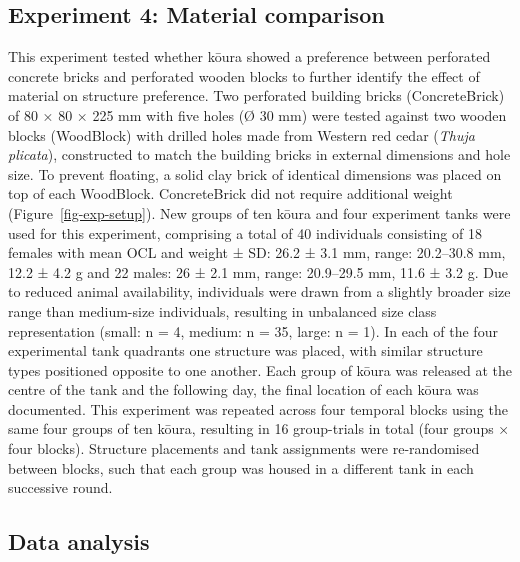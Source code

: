 \documentclass[
  12pt,
  a4paper,
  oneside]{scrbook}
\begin{document}
\subsection{Experiment 4: Material
comparison}\label{experiment-4-material-comparison}

This experiment tested whether kōura showed a preference between
perforated concrete bricks and perforated wooden blocks to further
identify the effect of material on structure preference. Two perforated
building bricks (ConcreteBrick) of 80 × 80 × 225 mm with five holes (Ø
30 mm) were tested against two wooden blocks (WoodBlock) with drilled
holes made from Western red cedar (\emph{Thuja plicata}), constructed to
match the building bricks in external dimensions and hole size. To
prevent floating, a solid clay brick of identical dimensions was placed
on top of each WoodBlock. ConcreteBrick did not require additional
weight (Figure~\ref{fig-exp-setup}). New groups of ten kōura and four
experiment tanks were used for this experiment, comprising a total of 40
individuals consisting of 18 females with mean OCL and weight ± SD: 26.2
± 3.1 mm, range: 20.2--30.8 mm, 12.2 ± 4.2 g and 22 males: 26 ± 2.1 mm,
range: 20.9--29.5 mm, 11.6 ± 3.2 g. Due to reduced animal availability,
individuals were drawn from a slightly broader size range than
medium-size individuals, resulting in unbalanced size class
representation (small: n = 4, medium: n = 35, large: n = 1). In each of
the four experimental tank quadrants one structure was placed, with
similar structure types positioned opposite to one another. Each group
of kōura was released at the centre of the tank and the following day,
the final location of each kōura was documented. This experiment was
repeated across four temporal blocks using the same four groups of ten
kōura, resulting in 16 group-trials in total (four groups × four
blocks). Structure placements and tank assignments were re-randomised
between blocks, such that each group was housed in a different tank in
each successive round.

\subsection{Data analysis}\label{data-analysis-1}
\end{document}
